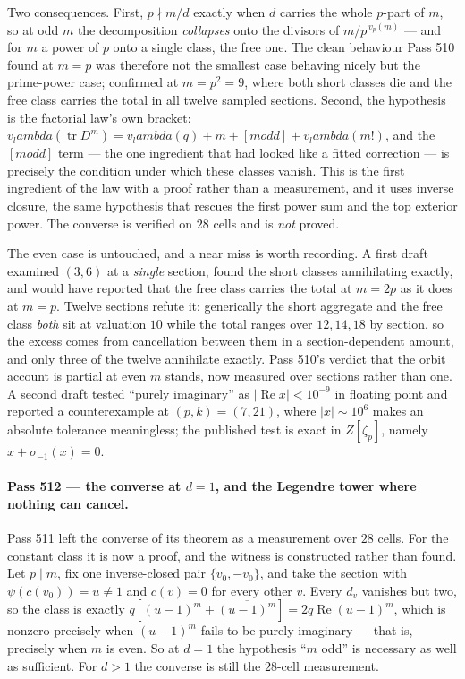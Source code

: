 \documentclass[12pt,a4paper]{article}
\def\mathbb#1{#1}%
\def\text#1{#1}%
\def\lambda{lambda}%
\theoremstyle{definition}
\newcommand{\ZZ}{\mathbb{Z}}
\begin{document}
Two consequences.  First, $p\nmid m/d$ exactly when $d$ carries the whole
$p$-part of $m$, so at odd $m$ the decomposition \emph{collapses} onto the
divisors of $m/p^{\,v_p(m)}$ --- and for $m$ a power of $p$ onto a single
class, the free one.  The clean behaviour Pass 510 found at $m=p$ was therefore
not the smallest case behaving nicely but the prime-power case; confirmed at
$m=p^2=9$, where both short classes die and the free class carries the total in
all twelve sampled sections.  Second, the hypothesis is the factorial law's own
bracket: $v_\lambda(\operatorname{tr}D^m)=v_\lambda(q)+m+[m\text{ odd}]
+v_\lambda(m!)$, and the $[m\text{ odd}]$ term --- the one ingredient that had
looked like a fitted correction --- is precisely the condition under which
these classes vanish.  This is the first ingredient of the law with a proof
rather than a measurement, and it uses inverse closure, the same hypothesis
that rescues the first power sum and the top exterior power.  The converse is
verified on $28$ cells and is \emph{not} proved.

The even case is untouched, and a near miss is worth recording.  A first draft
examined $(3,6)$ at a \emph{single} section, found the short classes
annihilating exactly, and would have reported that the free class carries the
total at $m=2p$ as it does at $m=p$.  Twelve sections refute it: generically
the short aggregate and the free class \emph{both} sit at valuation $10$ while
the total ranges over $12,14,18$ by section, so the excess comes from
cancellation between them in a section-dependent amount, and only three of the
twelve annihilate exactly.  Pass 510's verdict that the orbit account is
partial at even $m$ stands, now measured over sections rather than one.  A
second draft tested ``purely imaginary'' as $|\operatorname{Re}x|<10^{-9}$ in
floating point and reported a counterexample at $(p,k)=(7,21)$, where
$|x|\sim10^{6}$ makes an absolute tolerance meaningless; the published test is
exact in $\ZZ[\zeta_p]$, namely $x+\sigma_{-1}(x)=0$.

\paragraph{Pass 512 --- the converse at $d=1$, and the Legendre tower where
nothing can cancel.}
Pass 511 left the converse of its theorem as a measurement over $28$ cells.
For the constant class it is now a proof, and the witness is constructed rather
than found.  Let $p\mid m$, fix one inverse-closed pair $\{v_0,-v_0\}$, and take
the section with $\psi(c(v_0))=u\neq1$ and $c(v)=0$ for every other $v$.  Every
$d_v$ vanishes but two, so the class is exactly
$q[(u-1)^m+\overline{(u-1)^m}]=2q\operatorname{Re}(u-1)^m$, which is nonzero
precisely when $(u-1)^m$ fails to be purely imaginary --- that is, precisely
when $m$ is even.  So at $d=1$ the hypothesis ``$m$ odd'' is necessary as well
as sufficient.  For $d>1$ the converse is still the $28$-cell measurement.
\end{document}

